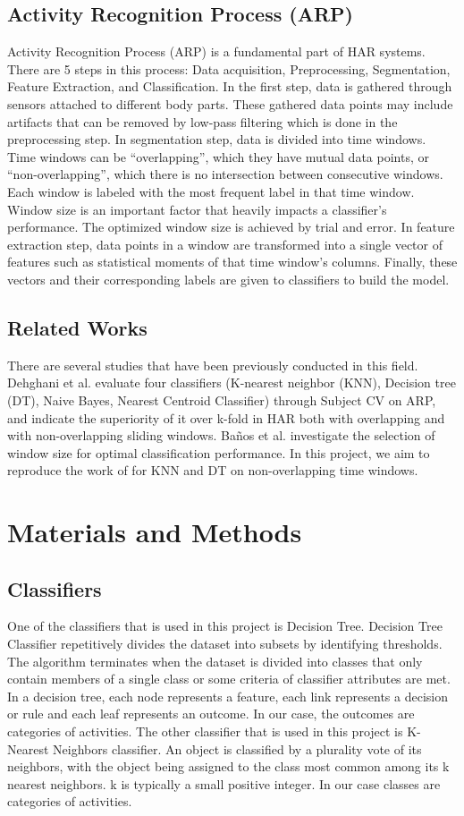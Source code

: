 \documentclass[12pt, a4paper]{article}
\begin{document}
\subsection{Activity Recognition Process (ARP)} 
Activity Recognition Process (ARP) is a fundamental part of HAR systems. There are 5 steps in this process: Data acquisition, Preprocessing, Segmentation, Feature Extraction, and Classification. In the first step, data is gathered through sensors attached to different body parts. These gathered data points may include artifacts that can be removed by low-pass filtering which is done in the preprocessing step. In segmentation step, data is divided into time windows. Time windows can be “overlapping”, which they have mutual data points, or “non-overlapping”, which there is no intersection between consecutive windows. Each window is labeled with the most frequent label in that time window. Window size is an important factor that heavily impacts a classifier’s performance. The optimized window size is achieved by trial and error. \cite{banos}
In feature extraction step, data points in a window are transformed into a single vector of features such as statistical moments of that time window’s columns. Finally, these vectors and their corresponding labels are given to classifiers to build the model.
\subsection{Related Works}
There are several studies that have been previously conducted in this field. Dehghani et al. \cite{dehghani}  evaluate four classifiers (K-nearest neighbor (KNN), Decision tree (DT), Naive Bayes, Nearest Centroid Classifier) through Subject CV on ARP, and indicate the superiority of it over k-fold in HAR both with overlapping and with non-overlapping sliding windows. Baños et al. \cite{banos} investigate the selection of window size for optimal classification performance. In this project, we aim to reproduce the work of \cite{dehghani}  for KNN and DT on non-overlapping time windows.

\section{Materials and Methods}
\subsection{Classifiers}
One of the classifiers that is used in this project is Decision Tree. Decision Tree Classifier repetitively divides the dataset into subsets by identifying thresholds. The algorithm terminates when the dataset is divided into classes that only contain members of a single class or some criteria of classifier attributes are met. In a decision tree, each node represents a feature, each link represents a decision or rule and each leaf represents an outcome. In our case, the outcomes are categories of activities.
The other classifier that is used in this project is K-Nearest Neighbors classifier. An object is classified by a plurality vote of its neighbors, with the object being assigned to the class most common among its k nearest neighbors. k is typically a small positive integer. In our case classes are categories of activities.
\end{document}
